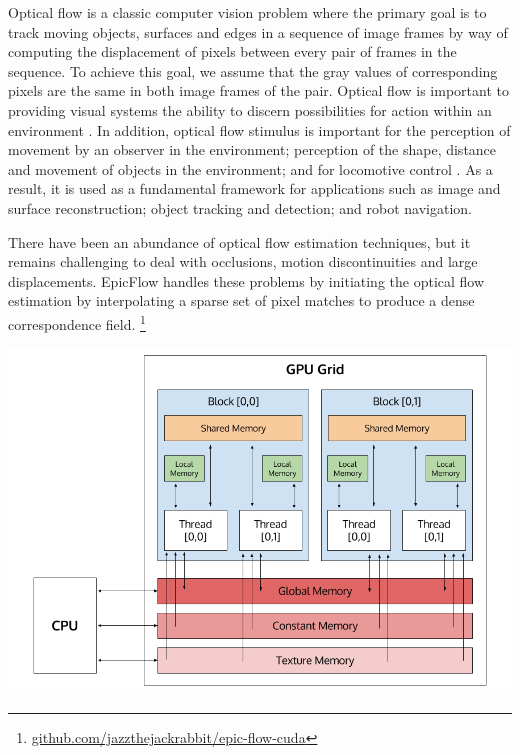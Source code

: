 \documentclass[english]{article}
\begin{document}
	Optical flow is a classic computer vision problem where the primary goal is to track moving objects, surfaces and edges in a sequence of image frames by way of computing the displacement of pixels between every pair of frames in the sequence. To achieve this goal, we assume that the gray values of corresponding pixels are the same in both image frames of the pair. Optical flow is important to providing visual systems the ability to discern possibilities for action within an environment \cite{8}. In addition, optical flow stimulus is important for the perception of movement by an observer in the environment; perception of the shape, distance and movement of objects in the environment; and for locomotive control \cite{9}. As a result, it is used as a fundamental framework for applications such as image and surface reconstruction; object tracking and detection; and robot navigation.\newline

	There have been an abundance of optical flow estimation techniques, but it remains challenging to deal with occlusions, motion discontinuities and large displacements. EpicFlow \cite{1} handles these problems by initiating the optical flow estimation by interpolating a sparse set of pixel matches to produce a dense correspondence field. \footnote{\href{https://github.com/jazzthejackrabbit/epic-flow-cuda}{github.com/jazzthejackrabbit/epic-flow-cuda}}\newline

	\begin{center}
	\includegraphics[width=160mm]{results/images/1_gpu_grid.png}
	\end{center}
\end{document}

